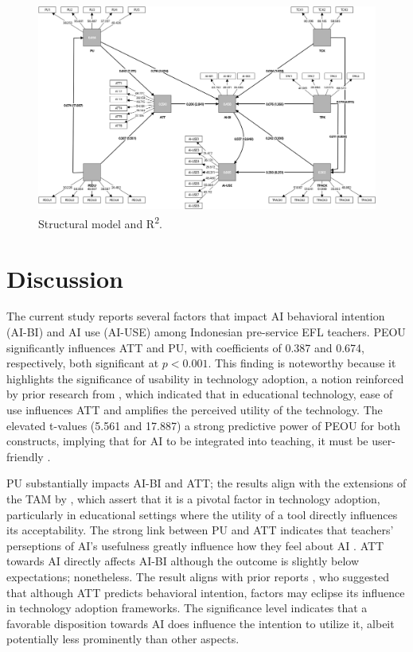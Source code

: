 \documentclass[english]{textolivre}
\begin{document}
\begin{figure}
    \centering
    \begin{minipage}{0.75\linewidth}
    \includegraphics[width=\linewidth]{Fig3.png}
    \caption{Structural model and R\textsuperscript{2}.}
    \label{fig3}
    \end{minipage}
\end{figure}

\section{Discussion}\label{sec-listas}
The current study reports several factors that impact AI behavioral intention (AI-BI) and AI use (AI-USE) among Indonesian pre-service EFL teachers. PEOU significantly influences ATT and PU, with coefficients of 0.387 and 0.674, respectively, both significant at $p < 0.001$. This finding is noteworthy because it highlights the significance of usability in technology adoption, a notion reinforced by prior research from \cite{dehghani2024chatgpt}, which indicated that in educational technology, ease of use influences ATT and amplifies the perceived utility of the technology. The elevated t-values (5.561 and 17.887) a strong predictive power of PEOU for both constructs, implying that for AI to be integrated into teaching, it must be user-friendly \cite{alabdullatif2023chatbots,chen2024mr,ma2024tam,wu2023aiuse,yuviler2024chatbot}. 

PU substantially impacts AI-BI and ATT; the results align with the extensions of the TAM by \textcite{davis1989tam}, which assert that it is a pivotal factor in technology adoption, particularly in educational settings where the utility of a tool directly influences its acceptability. The strong link between PU and ATT indicates that teachers’ perseptions of AI's usefulness greatly influence how they feel about AI \cite{gumbi2024dgb,peng2022kiosks,wang2021aiadoption,weng2018tam}. ATT towards AI directly affects AI-BI although the outcome is slightly below expectations; nonetheless. The result aligns with prior reports \cite{allali2024chatgpt,dehghani2024chatgpt,ma2024tam}, who suggested that although ATT predicts behavioral intention, factors may eclipse its influence in technology adoption frameworks. The significance level indicates that a favorable disposition towards AI does influence the intention to utilize it, albeit potentially less prominently than other aspects.
\end{document}
